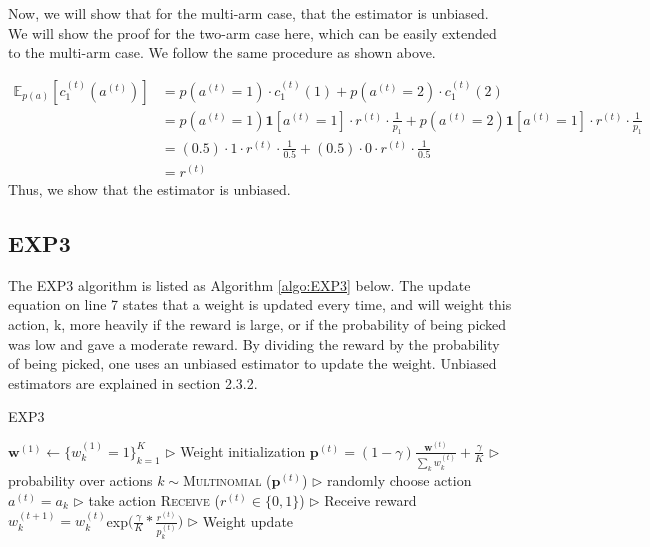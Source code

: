 \documentclass[11pt]{article}
\begin{document}
Now, we will show that for the multi-arm case, that the estimator is unbiased. We will show the proof for the two-arm case here, which can be easily extended to the multi-arm case. We follow the same procedure as shown above.

\begin{align} \mathbb{E}_{p(a)}\left[c_{1}^{(t)}\left(a^{(t)}\right)\right] &=p\left(a^{(t)}=1\right) \cdot c_{1}^{(t)}(1)+p\left(a^{(t)}=2\right) \cdot c_{1}^{(t)}(2) \\ &=p\left(a^{(t)}=1\right) \mathbf{1}\left[a^{(t)}=1\right] \cdot r^{(t)} \cdot \frac{1}{p_{1}}+p\left(a^{(t)}=2\right) \mathbf{1}\left[a^{(t)}=1\right] \cdot r^{(t)} \cdot \frac{1}{p_{1}} \\ &=(0.5) \cdot 1 \cdot r^{(t)} \cdot \frac{1}{0.5}+(0.5) \cdot 0 \cdot r^{(t)} \cdot \frac{1}{0.5} \\ &=r^{(t)}
\end{align}
Thus, we show that the estimator is unbiased.

\subsection{EXP3}
\normalfont
The EXP3 algorithm is listed as Algorithm \ref{algo:EXP3} below. The update equation on line 7 states that a weight is updated every time, and will weight this action, k, more heavily if the reward is large, or if the probability of being picked was low and gave a moderate reward. By dividing the reward by the probability of being picked, one uses an unbiased estimator to update the weight. Unbiased estimators are explained in section 2.3.2.

\begin{algorithm}[H]
\caption{EXP3}
\label{algo:EXP3}
\begin{algorithmic}[1]
\STATE $\textbf{w}^{(1)} \leftarrow \{w_k^{(1)}=1\}_{k=1}^K$ \hfill $\triangleright$ Weight initialization
\STATE $\textbf{p}^{(t)}=(1-\gamma)\frac{\textbf{w}^{(t)}}{\sum_kw_k^{(t)}}+\frac{\gamma}{K}$ \hfill $\triangleright$ probability over actions
\STATE $k \sim$\textsc{Multinomial} ($\textbf{p}^{(t)}$) \hfill $\triangleright$ randomly choose action
\STATE $a^{(t)} = a_k$ \hfill $\triangleright$ take action
\STATE \textsc{Receive} ($r^{(t)}\in\{0, 1\}$) \hfill $\triangleright$ Receive reward
\STATE $w_k^{(t+1)} = w_k^{(t)}$exp$\big(\frac{\gamma}{K}*\frac{r^{(t)}}{p_k^{(t)}}\big)$ \hfill $\triangleright$ Weight update
\ENDFOR
\end{algorithmic}
\end{algorithm}
\end{document}
